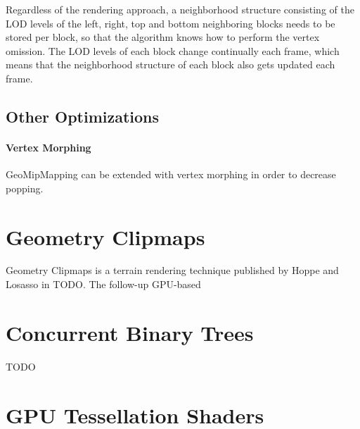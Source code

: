Regardless of the rendering approach, a neighborhood structure consisting of the LOD levels of the left, right, top and bottom 
neighboring blocks needs to be stored per block, so that the algorithm knows how to perform the vertex omission. The LOD levels of each block change continually each frame, which means 
that the neighborhood structure of each block also gets updated each frame.

\subsection{Other Optimizations}
\paragraph{Vertex Morphing}
GeoMipMapping can be extended with vertex morphing in order to decrease popping.




\section{Geometry Clipmaps}
Geometry Clipmaps is a terrain rendering technique published by Hoppe and Losasso in TODO.
The follow-up GPU-based 


\section{Concurrent Binary Trees}
TODO

\section{GPU Tessellation Shaders}


